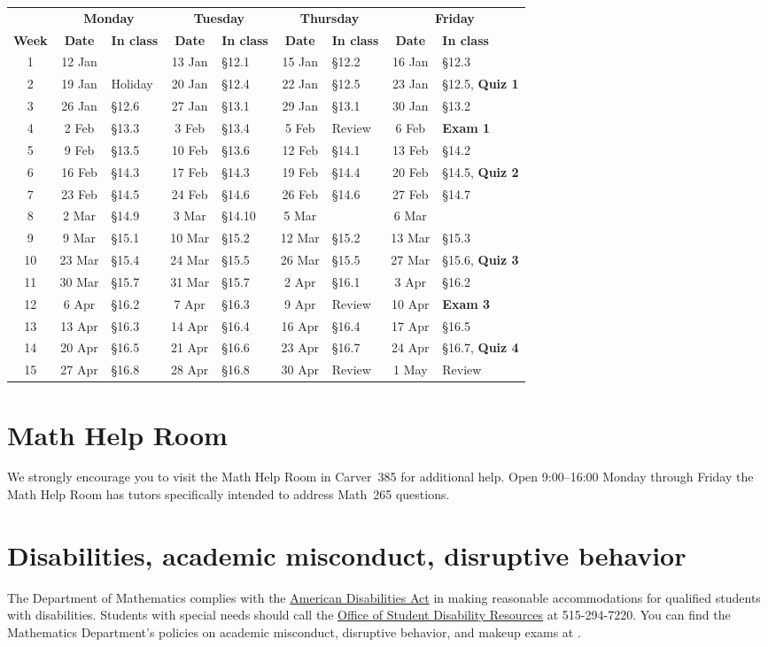 \documentclass[11pt]{article}
\begin{document}
\begin{tabular}{c|cl|cl|cl|cl}
&\multicolumn{2}{c|}{\bf Monday}
&\multicolumn{2}{c|}{\bf Tuesday}
&\multicolumn{2}{c|}{\bf Thursday}
&\multicolumn{2}{c}{\bf Friday}\\
{\bf Week}&{\bf Date}&{\bf In class}
&{\bf Date}&{\bf In class}&{\bf Date}&{\bf In class}
&{\bf Date}&{\bf In class}\\\toprule
1&12 Jan&&13 Jan&\S12.1&15 Jan&\S12.2&16 Jan&\S12.3\\\midrule
2&19 Jan&Holiday&20 Jan&\S12.4&22 Jan&\S12.5&23 Jan&\S12.5, {\bf Quiz 1}\\\midrule
3&26 Jan&\S12.6&27 Jan&\S13.1&29 Jan&\S13.1&30 Jan&\S13.2\\\midrule
4&2 Feb&\S13.3&3 Feb&\S13.4&5 Feb&Review&6 Feb&{\bf Exam 1}\\\midrule
5&9 Feb&\S13.5&10 Feb&\S13.6&12 Feb&\S14.1&13 Feb&\S14.2\\\midrule
6&16 Feb&\S14.3&17 Feb&\S14.3&19 Feb&\S14.4&20 Feb&\S14.5, {\bf Quiz 2}\\\midrule
7&23 Feb&\S14.5&24 Feb&\S14.6&26 Feb&\S14.6&27 Feb&\S14.7\\\midrule
8&2 Mar&\S14.9&3 Mar&\S14.10&5 Mar&&6 Mar&\\\midrule
9&9 Mar&\S15.1&10 Mar&\S15.2&12 Mar&\S15.2&13 Mar&\S15.3 \\\midrule
10&23 Mar&\S15.4&24 Mar&\S15.5&26 Mar&\S15.5&27 Mar&\S15.6, {\bf Quiz 3}\\\midrule
11&30 Mar&\S15.7&31 Mar&\S15.7&2 Apr&\S16.1&3 Apr&\S16.2\\\midrule
12&6 Apr&\S16.2&7 Apr&\S16.3&9 Apr&Review&10 Apr&{\bf Exam 3}\\\midrule
13&13 Apr&\S16.3&14 Apr&\S16.4&16 Apr&\S16.4&17 Apr&\S16.5\\\midrule
14&20 Apr&\S16.5&21 Apr&\S16.6&23 Apr&\S16.7&24 Apr&\S16.7, {\bf Quiz 4}\\\midrule
15&27 Apr&\S16.8&28 Apr&\S16.8&30 Apr&Review&1 May&Review\\\midrule
\end{tabular}

\section{Math Help Room}\label{MathCenter}
We strongly encourage you to visit the Math Help Room
in Carver~385 for additional help.
Open 9:00--16:00 Monday through Friday the Math Help Room
has tutors specifically intended to address Math~265 questions.

\section{Disabilities, academic misconduct, disruptive behavior}
The Department of Mathematics complies with the 
\href{http://www.ada.gov}{American Disabilities Act} in making reasonable 
accommodations for qualified students with disabilities.  Students with 
special needs should call the 
\href{http://www.dso.iastate.edu/dr}{Office of Student Disability Resources} at
515-294-7220.
You can find the Mathematics Department's policies on 
academic misconduct, disruptive behavior, and makeup exams at
.
\end{document}

